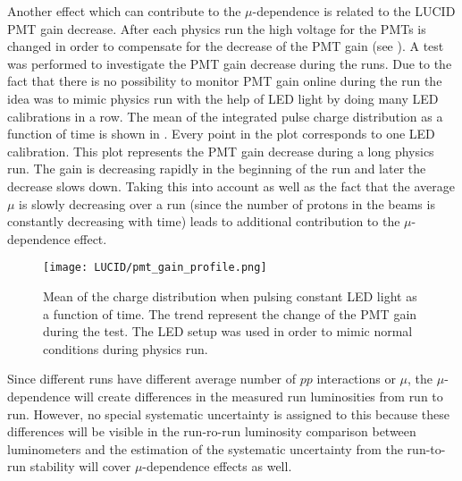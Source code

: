 Another effect which can contribute to the $\mu$-dependence is related to the LUCID PMT gain decrease.
After each physics run the high voltage for the PMTs is changed in order to compensate for the decrease of the PMT gain (see ).
A test was performed to investigate the PMT gain decrease during the runs. Due to the fact that there is no possibility to monitor 
PMT gain online during the run the idea was to mimic physics run with the help of LED light by doing many LED calibrations in a row.
The mean of the integrated pulse charge distribution as a function of time is shown in . Every point in the plot corresponds to one LED calibration.
This plot represents the PMT gain decrease during a long physics run. The gain is decreasing rapidly in the beginning of the run and later the decrease slows down.
Taking this into account as well as the fact that the average $\mu$ is slowly decreasing over a run 
(since the number of protons in the beams is constantly decreasing with time) leads to additional contribution to the $\mu$-dependence effect.

\begin{figure}
\centering
\texttt{[image: LUCID/pmt\_gain\_profile.png]}
\caption{Mean of the charge distribution when pulsing constant LED light as a function of time. The trend represent the change of the PMT gain during the test.
The LED setup was used in order to mimic normal conditions during physics run.}
\label{fig:pmt_gain_profile}
\end{figure}

Since different runs have different average number of $pp$ interactions or $\mu$, the $\mu$-dependence will create differences in the measured run luminosities from run to run.
However, no special systematic uncertainty is assigned to this because these differences will be visible in the run-ro-run luminosity comparison between luminometers 
and the estimation of the systematic uncertainty from the run-to-run stability will cover $\mu$-dependence effects as well.

